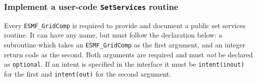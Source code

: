  
\setlength{\oldparskip}{\parskip}
\setlength{\parskip}{1.5ex}
\setlength{\oldparindent}{\parindent}
\setlength{\parindent}{0pt}
\setlength{\oldbaselineskip}{\baselineskip}
\setlength{\baselineskip}{11pt}
 
\def\bv{\begin{verbatim}}
\def\ev{\end{verbatim}}
\def\be{\begin{equation}}
\def\ee{\end{equation}}
\def\bea{\begin{eqnarray}}
\def\eea{\end{eqnarray}}
\def\bi{\begin{itemize}}
\def\ei{\end{itemize}}
\def\bn{\begin{enumerate}}
\def\en{\end{enumerate}}
\def\bd{\begin{description}}
\def\ed{\end{description}}
\def\({\left (}
\def\){\right )}
\def\[{\left [}
\def\]{\right ]}
\def\<{\left  \langle}
\def\>{\right \rangle}
\def\cI{{\cal I}}
\def\diag{\mathop{\rm diag}}
\def\tr{\mathop{\rm tr}}


 

  \subsubsection{Implement a user-code {\tt SetServices} routine}
   
   \label{sec:GridSetServ}
  
   Every {\tt ESMF\_GridComp} is required to provide and document
   a public set services routine.  It can have any name, but must
   follow the declaration below: a subroutine which takes an
   {\tt ESMF\_GridComp} as the first argument, and
   an integer return code as the second.
   Both arguments are required and must {\em not} be declared as 
   {\tt optional}. If an intent is specified in the interface it must be 
   {\tt intent(inout)} for the first and {\tt intent(out)} for the 
   second argument.
  
